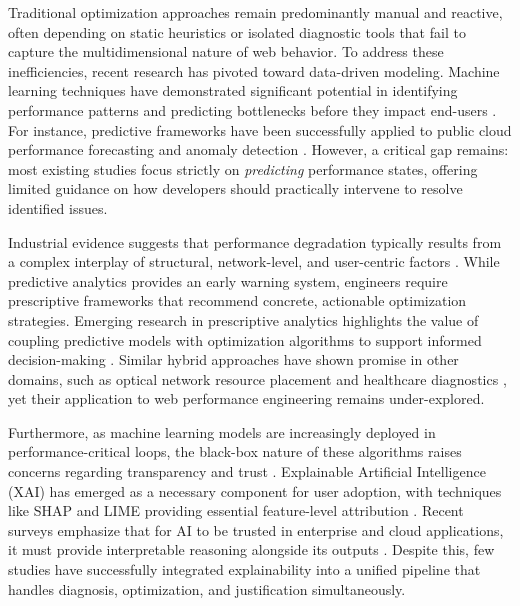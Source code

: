 \documentclass[sn-nature]{sn-jnl}
\begin{document}
Traditional optimization approaches remain predominantly manual and reactive, often depending on static heuristics or isolated diagnostic tools that fail to capture the multidimensional nature of web behavior. To address these inefficiencies, recent research has pivoted toward data-driven modeling. Machine learning techniques have demonstrated significant potential in identifying performance patterns and predicting bottlenecks before they impact end-users \cite{ghattas2025, mathur2024, sehwag2024}. For instance, predictive frameworks have been successfully applied to public cloud performance forecasting \cite{huang2023} and anomaly detection \cite{xin2023}. However, a critical gap remains: most existing studies focus strictly on \textit{predicting} performance states, offering limited guidance on how developers should practically intervene to resolve identified issues.

Industrial evidence suggests that performance degradation typically results from a complex interplay of structural, network-level, and user-centric factors \cite{vanriet2023}. While predictive analytics provides an early warning system, engineers require prescriptive frameworks that recommend concrete, actionable optimization strategies. Emerging research in prescriptive analytics highlights the value of coupling predictive models with optimization algorithms to support informed decision-making \cite{notz2024, surianarayanan2023}. Similar hybrid approaches have shown promise in other domains, such as optical network resource placement \cite{goscien2025} and healthcare diagnostics \cite{asha2025}, yet their application to web performance engineering remains under-explored.

Furthermore, as machine learning models are increasingly deployed in performance-critical loops, the black-box nature of these algorithms raises concerns regarding transparency and trust \cite{goyal2025}. Explainable Artificial Intelligence (XAI) has emerged as a necessary component for user adoption, with techniques like SHAP and LIME providing essential feature-level attribution \cite{salih2024, goldwasser2024}. Recent surveys emphasize that for AI to be trusted in enterprise and cloud applications, it must provide interpretable reasoning alongside its outputs \cite{hassija2024, mersha2024, benleulmi2025}. Despite this, few studies have successfully integrated explainability into a unified pipeline that handles diagnosis, optimization, and justification simultaneously.
\end{document}
